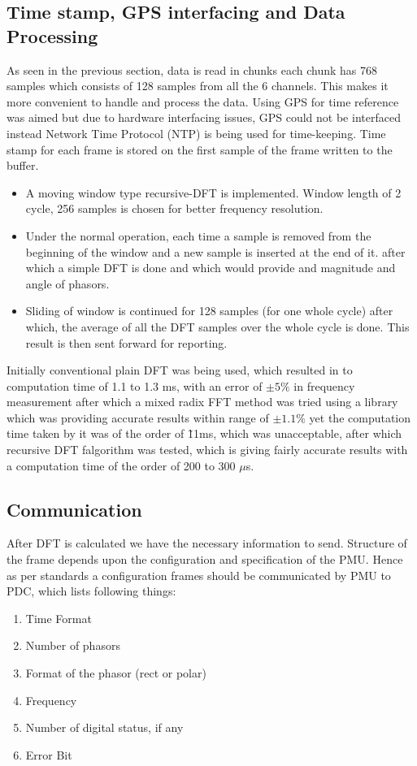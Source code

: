 \subsection{Time stamp, GPS interfacing and Data Processing }
As seen in the previous section, data is read in chunks each chunk has 768 samples which consists of 128 samples from all the 6 channels. This makes it more convenient to handle and process the data. Using GPS for time reference was aimed but due to hardware interfacing issues, GPS could not be interfaced instead Network Time Protocol (NTP) is being used for time-keeping. Time stamp for each frame is stored on the first sample of the frame written to the buffer.

\begin{itemize}
	\item A moving window type recursive-DFT is implemented. Window length of 2 cycle, 256 samples is chosen for better frequency resolution.
	\item Under the normal operation, each time a sample is removed from the beginning of the window and a new sample is inserted at the end of it. after which a simple DFT is done and which would provide and magnitude and angle of phasors.
	\item Sliding of window is continued for 128 samples (for one whole cycle) after which, the average of all the DFT samples over the whole cycle is done. This result is then sent forward for reporting.
\end{itemize} 

Initially conventional plain DFT was being used, which resulted in to computation time of 1.1 to 1.3 ms, with an error of $\pm 5 \%$ in frequency measurement after which a mixed radix FFT method was tried using a library \cite{kissFFT} which was providing accurate results within range of $\pm1.1\% $ yet the computation time taken by it was of the order of \~11ms, which was unacceptable, after which recursive DFT falgorithm was tested, which is giving fairly accurate results with a computation time of the order of 200 to 300 $\mu$s.



\subsection{Communication}

After DFT is calculated we have the necessary information to send. Structure of the frame depends upon the configuration and specification of the PMU. Hence as per standards a configuration frames should be communicated by PMU to PDC, which lists following things:
\begin{enumerate}
	\item Time Format 
	\item Number of phasors
	\item Format of the phasor (rect or polar)
	\item Frequency
	\item Number of digital status, if any
	\item Error Bit
\end{enumerate}

